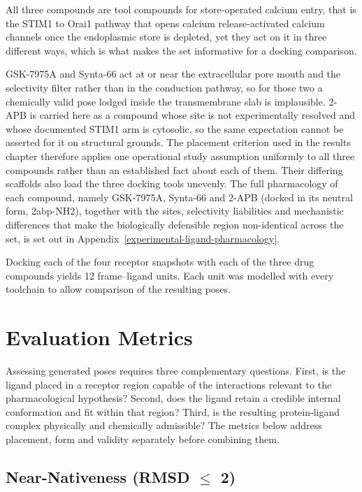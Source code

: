 All three compounds are tool compounds for store-operated calcium entry, that is the STIM1 to Orai1 pathway that opens calcium release-activated calcium channels once the endoplasmic store is depleted, yet they act on it in three different ways, which is what makes the set informative for a docking comparison.

GSK-7975A and Synta-66 act at or near the extracellular pore mouth and the selectivity filter rather than in the conduction pathway, so for those two a chemically valid pose lodged inside the transmembrane slab is implausible. 2-APB is carried here as a compound whose site is not experimentally resolved and whose documented STIM1 arm is cytosolic, so the same expectation cannot be asserted for it on structural grounds. The placement criterion used in the results chapter therefore applies one operational study assumption uniformly to all three compounds rather than an established fact about each of them. Their differing scaffolds also load the three docking tools unevenly. The full pharmacology of each compound, namely GSK-7975A, Synta-66 and 2-APB (docked in its neutral form, 2abp-NH2), together with the sites, selectivity liabilities and mechanistic differences that make the biologically defensible region non-identical across the set, is set out in Appendix~\ref{experimental-ligand-pharmacology}.

Docking each of the four receptor snapshots with each of the three drug compounds yields 12 frame--ligand units. Each unit was modelled with every toolchain to allow comparison of the resulting poses.

\hypertarget{evaluation-metrics}{%
\section{Evaluation Metrics}\label{evaluation-metrics}}

Assessing generated poses requires three complementary questions. First, is the ligand placed in a receptor region capable of the interactions relevant to the pharmacological hypothesis? Second, does the ligand retain a credible internal conformation and fit within that region? Third, is the resulting protein-ligand complex physically and chemically admissible? The metrics below address placement, form and validity separately before combining them.

\hypertarget{near-nativeness-rmsd-2uxe5}{%
\subsection{\texorpdfstring{Near-Nativeness (RMSD \ensuremath{\leq} 2\angstrom{})}{Near-Nativeness (RMSD <= 2 Angstrom)}}\label{near-nativeness-rmsd-2uxe5}}

